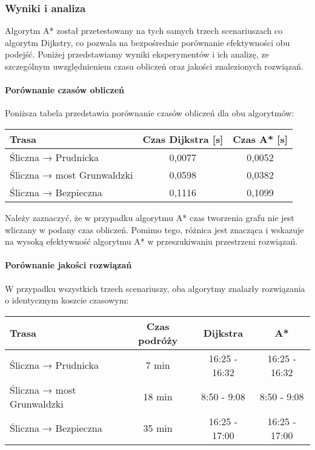 \documentclass[12pt,a4paper]{article}
\begin{document}
\subsubsection{Wyniki i analiza}
Algorytm A* został przetestowany na tych samych trzech scenariuszach co algorytm Dijkstry, co pozwala na bezpośrednie porównanie efektywności obu podejść. Poniżej przedstawiamy wyniki eksperymentów i ich analizę, ze szczególnym uwzględnieniem czasu obliczeń oraz jakości znalezionych rozwiązań.

\paragraph{Porównanie czasów obliczeń}
Poniższa tabela przedstawia porównanie czasów obliczeń dla obu algorytmów:

\begin{center}
\begin{tabular}{|l|c|c|}
\hline
\textbf{Trasa} & \textbf{Czas Dijkstra [s]} & \textbf{Czas A* [s]} \\
\hline
Śliczna → Prudnicka & 0,0077 & 0,0052 \\
Śliczna → most Grunwaldzki & 0,0598 & 0,0382 \\
Śliczna → Bezpieczna & 0,1116 & 0,1099 \\
\hline
\end{tabular}
\end{center}

Należy zaznaczyć, że w przypadku algorytmu A* czas tworzenia grafu nie jest wliczany w podany czas obliczeń. Pomimo tego, różnica jest znacząca i wskazuje na wysoką efektywność algorytmu A* w przeszukiwaniu przestrzeni rozwiązań.

\paragraph{Porównanie jakości rozwiązań}
W przypadku wszystkich trzech scenariuszy, oba algorytmy znalazły rozwiązania o identycznym koszcie czasowym:

\begin{center}
\begin{tabular}{|l|c|c|c|}
\hline
\textbf{Trasa} & \textbf{Czas podróży} & \textbf{Dijkstra} & \textbf{A*} \\
\hline
Śliczna → Prudnicka & 7 min & 16:25 - 16:32 & 16:25 - 16:32 \\
Śliczna → most Grunwaldzki & 18 min & 8:50 - 9:08 & 8:50 - 9:08 \\
Śliczna → Bezpieczna & 35 min & 16:25 - 17:00 & 16:25 - 17:00 \\
\hline
\end{tabular}
\end{center}
\end{document}
